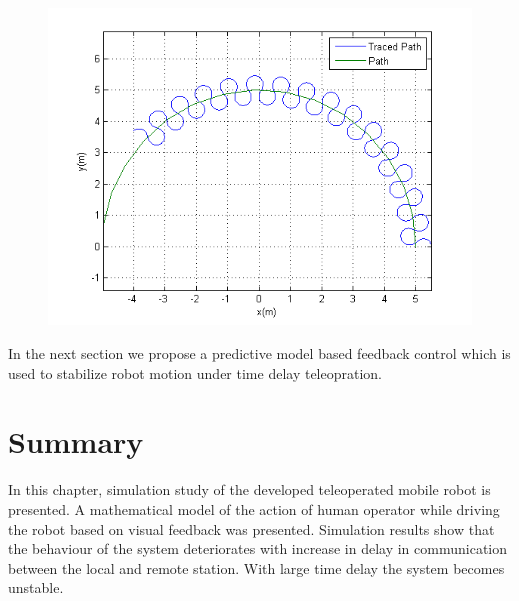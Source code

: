 \begin{figure}[h]
	\includegraphics[width=\linewidth,keepaspectratio]{Chapter6/fig/Delay800milsec}
	\label{fig:delay800plot} 
\end{figure} 

 In the next section we propose a predictive model based feedback control which is used to stabilize robot motion  under time delay teleopration.

\section{Summary}
In this chapter, simulation study of the developed teleoperated mobile robot is presented. A mathematical model of the action of human operator  while driving the robot based on visual feedback  was presented. Simulation results show that the behaviour of the system deteriorates with increase in delay in communication between the local and remote station. With large time delay the system becomes unstable.

